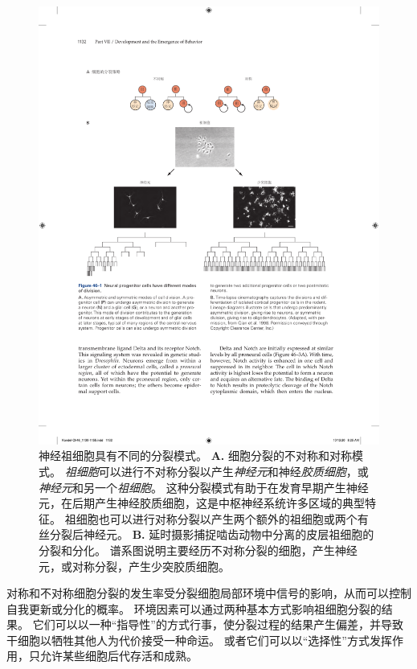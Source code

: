 \begin{figure}[htbp]
	\centering
	\includegraphics[width=1.0\linewidth]{chap46/fig_46_1}
	\caption{神经祖细胞具有不同的分裂模式。
		\textbf{A.} 细胞分裂的不对称和对称模式。
		\textit{祖细胞}可以进行不对称分裂以产生\textit{神经元}和神经\textit{胶质细胞}，或\textit{神经元}和另一个\textit{祖细胞}。
		这种分裂模式有助于在发育早期产生神经元，在后期产生神经胶质细胞，这是中枢神经系统许多区域的典型特征。
		祖细胞也可以进行对称分裂以产生两个额外的祖细胞或两个有丝分裂后神经元。
		\textbf{B.} 延时摄影捕捉啮齿动物中分离的皮层祖细胞的分裂和分化。
		谱系图说明主要经历不对称分裂的细胞，产生神经元，或对称分裂，产生少突胶质细胞\cite{qian1998intrinsic}。}
	\label{fig:46_1}
\end{figure}


对称和不对称细胞分裂的发生率受分裂细胞局部环境中信号的影响，从而可以控制自我更新或分化的概率。
环境因素可以通过两种基本方式影响祖细胞分裂的结果。 它们可以以一种“指导性”的方式行事，使分裂过程的结果产生偏差，并导致干细胞以牺牲其他人为代价接受一种命运。
或者它们可以以“选择性”方式发挥作用，只允许某些细胞后代存活和成熟。



